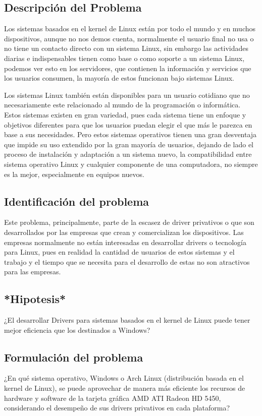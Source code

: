 \documentclass[conference]{IEEEtran}
\begin{document}
\subsection{Descripción del Problema}
Los sistemas basados en el kernel de Linux están por todo el mundo y en muchos dispositivos, aunque no nos demos cuenta, normalmente el usuario final no usa o no tiene un contacto directo con un sistema Linux, sin embargo las actividades diarias e indispensables tienen como base o como soporte a un sistema Linux, podemos ver esto en los servidores, que contienen la información y servicios que los usuarios consumen, la mayoría de estos funcionan bajo sistemas Linux.

Los sistemas Linux también están disponibles para un usuario cotidiano que no necesariamente este relacionado al mundo de la programación o informática. Estos sistemas existen en gran variedad, pues cada sistema tiene un enfoque y objetivos diferentes para que los usuarios puedan elegir el que más le parezca en base a sus necesidades. Pero estos sistemas operativos tienen una gran desventaja que impide su uso extendido por la gran mayoría de usuarios, dejando de lado el proceso de instalación y adaptación a un sistema nuevo, la compatibilidad entre sistema operativo Linux y cualquier componente de una computadora, no siempre es la mejor, especialmente en equipos nuevos. 
\subsection{Identificación del problema}
Este problema, principalmente, parte de la escasez de driver privativos o que son desarrollados por las empresas que crean y comercializan los dispositivos. Las empresas normalmente no están interesadas en desarrollar drivers o tecnología para Linux, pues en realidad la cantidad de usuarios de estos sistemas y el trabajo y el tiempo que se necesita para el desarrollo de estas no son atractivos para las empresas.
\subsection{*Hipotesis*}
¿El desarrollar Drivers para sistemas basados en el kernel de Linux puede tener mejor eficiencia que los destinados a Windows? 
\subsection{Formulación del problema}
¿En qué sistema operativo, Windows o Arch Linux (distribución basada en el kernel de Linux), se puede aprovechar de manera más eficiente los recursos de hardware y software de la tarjeta gráfica AMD ATI Radeon HD 5450, considerando el desempeño de sus drivers privativos en cada plataforma?
\end{document}

